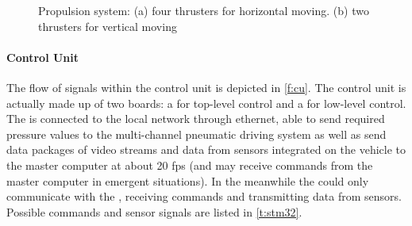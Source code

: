 \begin{figure}[htb]
    \caption[Propulsion system]{Propulsion system: (a) four thrusters for
        horizontal moving. (b) two thrusters for vertical
        moving}\label{f:propulsion}
\end{figure}

\paragraph{Control Unit}

The flow of signals within the control unit is depicted in \autoref{f:cu}. The
control unit is actually made up of two boards: a  for
top-level control and a  for low-level control. The
 is connected to the local network through ethernet, able to
send required pressure values to the multi-channel pneumatic driving system as
well as send data packages of video streams and data from sensors integrated on
the vehicle to the master computer at about 20 \gls{fps} (and may receive
commands from the master computer in emergent situations). In the meanwhile the
 could only communicate with the , receiving
commands and transmitting data from sensors. Possible commands and sensor
signals are listed in \autoref{t:stm32}.

